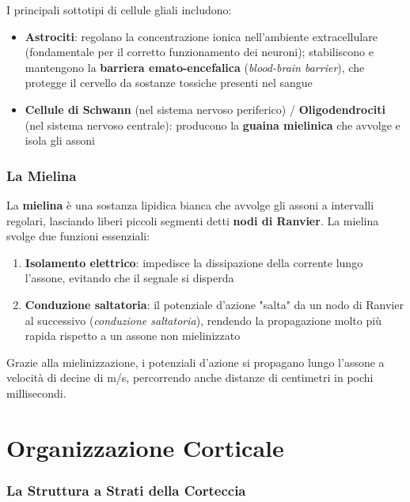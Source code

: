 I principali sottotipi di cellule gliali includono:

\begin{itemize}
    \item \textbf{Astrociti}: regolano la concentrazione ionica nell'ambiente extracellulare (fondamentale per il corretto funzionamento dei neuroni); stabiliscono e mantengono la \textbf{barriera emato-encefalica} (\textit{blood-brain barrier}), che protegge il cervello da sostanze tossiche presenti nel sangue
    \item \textbf{Cellule di Schwann} (nel sistema nervoso periferico) / \textbf{Oligodendrociti} (nel sistema nervoso centrale): producono la \textbf{guaina mielinica} che avvolge e isola gli assoni
\end{itemize}


\subsubsection{La Mielina}

La \textbf{mielina} è una sostanza lipidica bianca che avvolge gli assoni a intervalli regolari, lasciando liberi piccoli segmenti detti \textbf{nodi di Ranvier}. La mielina svolge due funzioni essenziali:

\begin{enumerate}
    \item \textbf{Isolamento elettrico}: impedisce la dissipazione della corrente lungo l'assone, evitando che il segnale si disperda
    \item \textbf{Conduzione saltatoria}: il potenziale d'azione "salta" da un nodo di Ranvier al successivo (\textit{conduzione saltatoria}), rendendo la propagazione molto più rapida rispetto a un assone non mielinizzato
\end{enumerate}

Grazie alla mielinizzazione, i potenziali d'azione si propagano lungo l'assone a velocità di decine di m/s, percorrendo anche distanze di centimetri in pochi millisecondi.


\section{Organizzazione Corticale}

\subsubsection{La Struttura a Strati della Corteccia}

